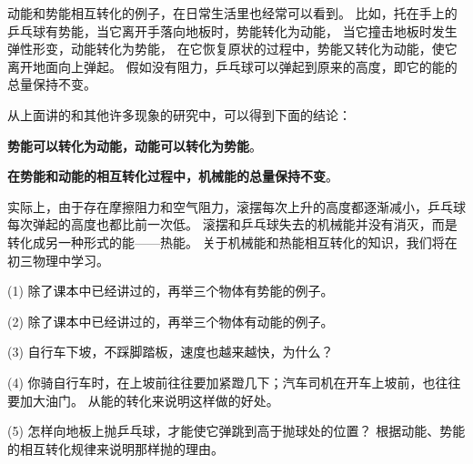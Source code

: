 动能和势能相互转化的例子，在日常生活里也经常可以看到。
比如，托在手上的乒乓球有势能，当它离开手落向地板时，势能转化为动能，
当它撞击地板时发生弹性形变，动能转化为势能，
在它恢复原状的过程中，势能又转化为动能，使它离开地面向上弹起。
假如没有阻力，乒乓球可以弹起到原来的高度，即它的能的总量保持不变。

从上面讲的和其他许多现象的研究中，可以得到下面的结论：

\textbf{势能可以转化为动能，动能可以转化为势能}。

\textbf{在势能和动能的相互转化过程中，机械能的总量保持不变}。

实际上，由于存在摩擦阻力和空气阻力，滚摆每次上升的高度都逐渐减小，乒乓球每次弹起的高度也都比前一次低。
滚摆和乒乓球失去的机械能并没有消灭，而是转化成另一种形式的能——热能。
关于机械能和热能相互转化的知识，我们将在初三物理中学习。



\lianxi

(1) 除了课本中已经讲过的，再举三个物体有势能的例子。

(2) 除了课本中已经讲过的，再举三个物体有动能的例子。

(3) 自行车下坡，不踩脚踏板，速度也越来越快，为什么？

(4) 你骑自行车时，在上坡前往往要加紧蹬几下；汽车司机在开车上坡前，也往往要加大油门。
从能的转化来说明这样做的好处。

(5) 怎样向地板上抛乒乓球，才能使它弹跳到高于抛球处的位置？
根据动能、势能的相互转化规律来说明那样抛的理由。

